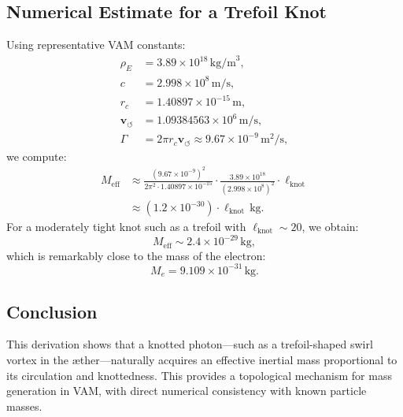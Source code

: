   \subsection{Numerical Estimate for a Trefoil Knot}

  Using representative VAM constants:
  \begin{align*}
    \rho_{\scriptscriptstyle\boldsymbol\!E}&= 3.89 \times 10^{18}\,\mathrm{kg/m}^3, \\
    c &= 2.998 \times 10^8\,\mathrm{m/s}, \\
    r_c &= 1.40897 \times 10^{-15}\,\mathrm{m}, \\
    \mathbf{v}_{\scriptscriptstyle\boldsymbol{\circlearrowleft}} &= 1.09384563 \times 10^6\,\mathrm{m/s}, \\
    \Gamma &= 2\pi r_c \mathbf{v}_{\scriptscriptstyle\boldsymbol{\circlearrowleft}} \approx 9.67 \times 10^{-9}\,\mathrm{m}^2/\mathrm{s},
  \end{align*}
  we compute:
  \begin{align*}
    M_\text{eff} &\approx \frac{(9.67 \times 10^{-9})^2}{2\pi^2 \cdot 1.40897 \times 10^{-15}} \cdot \frac{3.89 \times 10^{18}}{(2.998 \times 10^8)^2} \cdot \ell_\text{knot} \\
    &\approx (1.2 \times 10^{-30}) \cdot \ell_\text{knot}\,\mathrm{kg}.
  \end{align*}
  For a moderately tight knot such as a trefoil with $\ell_\text{knot} \sim 20$, we obtain:
  \begin{equation}
    M_\text{eff} \sim 2.4 \times 10^{-29}\,\mathrm{kg},
  \end{equation}
  which is remarkably close to the mass of the electron:
  \begin{equation}
    M_e = 9.109 \times 10^{-31}\,\mathrm{kg}.
  \end{equation}

  \subsection*{Conclusion}

  This derivation shows that a knotted photon---such as a trefoil-shaped swirl vortex in the \ae{}ther---naturally acquires an effective inertial mass proportional to its circulation and knottedness. This provides a topological mechanism for mass generation in VAM, with direct numerical consistency with known particle masses.